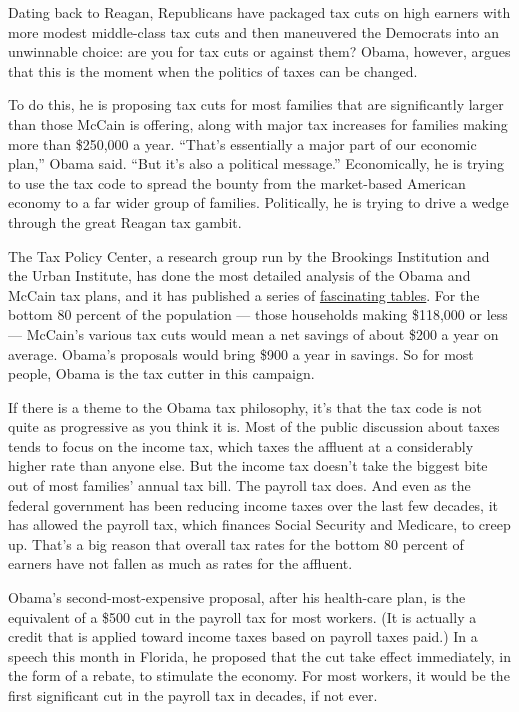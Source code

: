 Dating back to Reagan, Republicans have packaged tax cuts on high
earners with more modest middle-class tax cuts and then maneuvered the
Democrats into an unwinnable choice: are you for tax cuts or against
them? Obama, however, argues that this is the moment when the politics
of taxes can be changed.

To do this, he is proposing tax cuts for most families that are
significantly larger than those McCain is offering, along with major tax
increases for families making more than \$250,000 a year. ``That's
essentially a major part of our economic plan,'' Obama said. ``But it's
also a political message.'' Economically, he is trying to use the tax
code to spread the bounty from the market-based American economy to a
far wider group of families. Politically, he is trying to drive a wedge
through the great Reagan tax gambit.

The Tax Policy Center, a research group run by the Brookings Institution
and the Urban Institute, has done the most detailed analysis of the
Obama and McCain tax plans, and it has published a series of
\href{http://www.taxpolicycenter.org/UploadedPDF/411749_update_candidates.pdf}{fascinating
tables}. For the bottom 80 percent of the population --- those
households making \$118,000 or less --- McCain's various tax cuts would
mean a net savings of about \$200 a year on average. Obama's proposals
would bring \$900 a year in savings. So for most people, Obama is the
tax cutter in this campaign.

If there is a theme to the Obama tax philosophy, it's that the tax code
is not quite as progressive as you think it is. Most of the public
discussion about taxes tends to focus on the income tax, which taxes the
affluent at a considerably higher rate than anyone else. But the income
tax doesn't take the biggest bite out of most families' annual tax bill.
The payroll tax does. And even as the federal government has been
reducing income taxes over the last few decades, it has allowed the
payroll tax, which finances Social Security and Medicare, to creep up.
That's a big reason that overall tax rates for the bottom 80 percent of
earners have not fallen as much as rates for the affluent.

Obama's second-most-expensive proposal, after his health-care plan, is
the equivalent of a \$500 cut in the payroll tax for most workers. (It
is actually a credit that is applied toward income taxes based on
payroll taxes paid.) In a speech this month in Florida, he proposed that
the cut take effect immediately, in the form of a rebate, to stimulate
the economy. For most workers, it would be the first significant cut in
the payroll tax in decades, if not ever.

